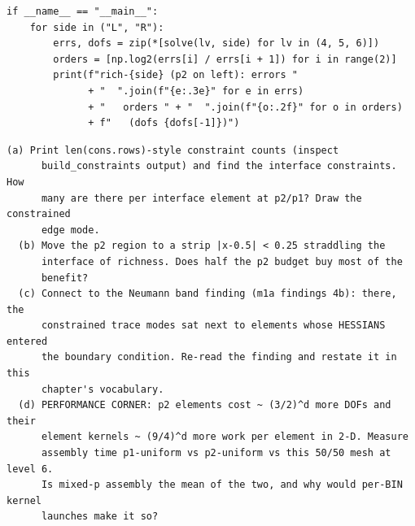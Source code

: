 \begin{lstlisting}
if __name__ == "__main__":
    for side in ("L", "R"):
        errs, dofs = zip(*[solve(lv, side) for lv in (4, 5, 6)])
        orders = [np.log2(errs[i] / errs[i + 1]) for i in range(2)]
        print(f"rich-{side} (p2 on left): errors "
              + "  ".join(f"{e:.3e}" for e in errs)
              + "   orders " + "  ".join(f"{o:.2f}" for o in orders)
              + f"   (dofs {dofs[-1]})")
\end{lstlisting}

\begin{explore}
\begin{verbatim}
(a) Print len(cons.rows)-style constraint counts (inspect
      build_constraints output) and find the interface constraints. How
      many are there per interface element at p2/p1? Draw the constrained
      edge mode.
  (b) Move the p2 region to a strip |x-0.5| < 0.25 straddling the
      interface of richness. Does half the p2 budget buy most of the
      benefit?
  (c) Connect to the Neumann band finding (m1a findings 4b): there, the
      constrained trace modes sat next to elements whose HESSIANS entered
      the boundary condition. Re-read the finding and restate it in this
      chapter's vocabulary.
  (d) PERFORMANCE CORNER: p2 elements cost ~ (3/2)^d more DOFs and their
      element kernels ~ (9/4)^d more work per element in 2-D. Measure
      assembly time p1-uniform vs p2-uniform vs this 50/50 mesh at level 6.
      Is mixed-p assembly the mean of the two, and why would per-BIN kernel
      launches make it so?
\end{verbatim}
\end{explore}

